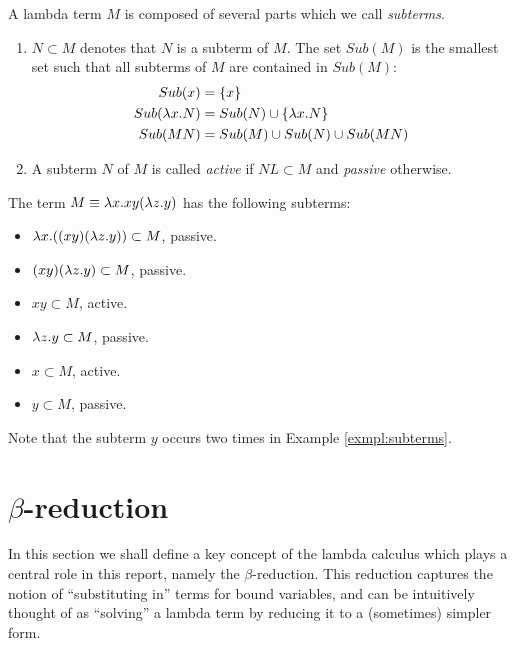 A lambda term $M$ is composed of several parts which we call \emph{subterms}.
\begin{definition}
	\begin{enumerate}
		\item $N\subset M$ denotes that $N$ is a subterm of $M$. The set $Sub(M)$ is the 
		smallest set such that all subterms of $M$ are contained in $Sub(M)$:
		\begin{align*}
			Sub(x) &=\{x\} \\
			Sub(\lambda x.N) &= Sub(N) \cup \{\lambda x.N\} \\
			Sub(M N) &= Sub(M) \cup Sub(N) \cup Sub(M N)
		\end{align*}
		\item A subterm $N$ of $M$ is called \emph{active} if $N L \subset M$ 
		and \emph{passive} otherwise.
	\end{enumerate}
\end{definition}
\begin{example}\label{exmpl:subterms}
	The term $M\equiv\lambda x.xy(\lambda z.y)$ has the following subterms:
	\begin{itemize}
		\item $\lambda x.((xy)(\lambda z.y))\subset M$, passive.
		\item $(xy)(\lambda z.y)\subset M$, passive.
		\item $xy\subset M$, active.
		\item $\lambda z.y\subset M$, passive.
		\item $x\subset M$, active.
		\item $y\subset M$, passive.
	\end{itemize}
\end{example}
Note that the subterm $y$ occurs two times in Example \ref{exmpl:subterms}.

\section{$\beta$-reduction}

In this section we shall define a key concept of the lambda calculus which
plays a central role in this report, namely the $\beta$-reduction. This
reduction captures the notion of ``substituting in'' terms for bound variables,
and can be intuitively thought of as ``solving'' a lambda term by reducing it
to a (sometimes) simpler form.


